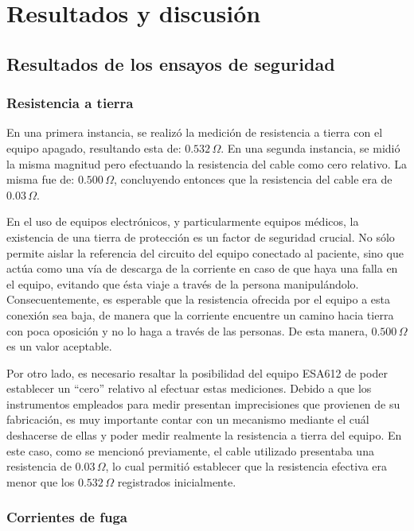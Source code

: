 \section{Resultados y discusión}

\subsection{Resultados de los ensayos de seguridad}

\subsubsection{Resistencia a tierra}

En una primera instancia, se realizó la medición de resistencia a tierra con el equipo apagado, resultando esta de: $0.532 \,\Omega$.
En una segunda instancia, se midió la misma magnitud pero efectuando la resistencia del cable como cero relativo. La misma fue de: $0.500 \,\Omega$, concluyendo entonces que la resistencia del cable era de $0.03 \,\Omega$.

En el uso de equipos electrónicos, y particularmente equipos médicos, la existencia de una tierra de protección es un factor de seguridad crucial. No sólo permite aislar la referencia del circuito del equipo conectado al paciente, sino que
    actúa como una vía de descarga de la corriente en caso de que haya una falla en el equipo, evitando que ésta viaje a través de la persona manipulándolo. Consecuentemente, es esperable que la resistencia ofrecida por el equipo a esta conexión
    sea baja, de manera que la corriente encuentre un camino hacia tierra con poca oposición y no lo haga a través de las personas. De esta manera, $0.500 \,\Omega$ es un valor aceptable.

Por otro lado, es necesario resaltar la posibilidad del equipo ESA612 de poder establecer un ``cero'' relativo al efectuar estas mediciones. Debido a que los instrumentos empleados para medir presentan imprecisiones que provienen de su fabricación, es muy
    importante contar con un mecanismo mediante el cuál deshacerse de ellas y poder medir realmente la resistencia a tierra del equipo. En este caso, como se mencionó previamente, el cable utilizado presentaba una resistencia de  $0.03 \,\Omega$, lo cual
    permitió establecer que la resistencia efectiva era menor que los $0.532 \,\Omega$ registrados inicialmente.

\subsubsection{Corrientes de fuga}

